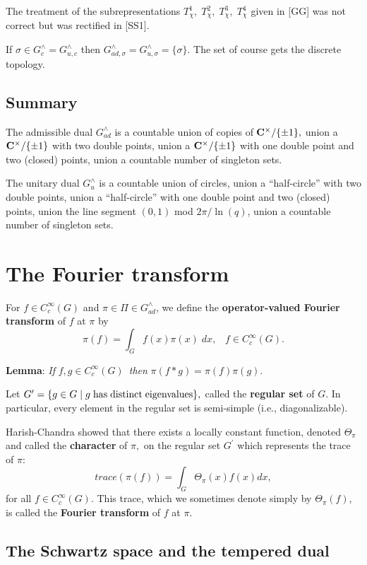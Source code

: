 The treatment of the subrepresentations $T_\chi ^1,\;T_\chi ^2,\;T_\chi
^3,\;T_\chi ^4$ given in [GG] was not correct but was rectified in [SS1].

If $\sigma \in G_c^{\wedge }=G_{u,c}^{\wedge }$ then $G_{ad,\sigma }^{\wedge
}=G_{u,\sigma }^{\wedge }=\{\sigma \}$. The set of course gets the discrete
topology.

\subsection{Summary}

The admissible dual $G_{ad}^{\wedge }$ is a countable union of copies of$\;%
{\bf C}^{\times }/\{\pm 1\},$ union a ${\bf C}^{\times }/\{\pm 1\}$ with two
double points, union a ${\bf C}^{\times }/\{\pm 1\}$ with one double point
and two (closed) points, union a countable number of singleton sets.

The unitary dual $G_u^{\wedge }$ is a countable union of circles, union a
``half-circle'' with two double points, union a ``half-circle'' with one
double point and two (closed) points, union the line segment $(0,1)$ mod $%
2\pi /\ln (q)$, union a countable number of singleton sets. 


\section{The Fourier transform}

For $f\in C_c^\infty (G)$ and $\pi \in \Pi \in G_{ad}^{\wedge }$, we define
the {\bf operator-valued Fourier transform} of $f$ at $\pi $ by 
\[
\pi (f)=\int_Gf(x)\pi (x)\;dx,\;\;\;f\in C_c^\infty (G). 
\]

{\bf Lemma}: {\em If }$f,g\in C_c^\infty (G)${\em \ then }$\pi (f*g)=\pi
(f)\pi (g).$

Let $G^{\prime }=\{g\in G\;|\;g\;{\rm has\;distinct\;eigenvalues}\},$ called
the {\bf regular set} of $G.$ In particular, every element in the regular
set is semi-simple (i.e., diagonalizable).

Harish-Chandra showed that there exists a locally constant function, denoted 
$\Theta _\pi $ and called the {\bf character} of $\pi ,$ on the regular set $%
G^{\prime }$ which represents the trace of $\pi :$%
\[
trace(\pi (f))=\int_G\Theta _\pi (x)f(x)dx, 
\]
for all $f\in C_c^\infty (G).$ This trace, which we sometimes denote simply
by $\Theta _\pi (f)$, is called the {\bf Fourier transform} of $f$ at $\pi .$

\subsection{The Schwartz space and the tempered dual}

